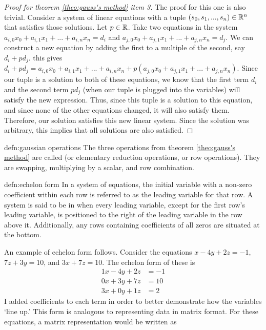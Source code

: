 \begin{proof}[Proof for theorem \ref{theo:gauss's method} item 3]
	The proof for this one is also trivial. Consider a system of linear equations with a tuple $(s_0, s_1,..., s_n) \in{\mathbb R}^n$ that satisfies those solutions. Let $p \in {\mathbb R}$. Take two equations in the system $a_{i,0}x_0 + a_{i,1}x_1 + ... + a_{i,n}x_n = d_i$ and $a_{j,0}x_0 + a_{j,1}x_1 + ... + a_{j,n}x_n = d_j$. We can construct a new equation by adding the first to a multiple of the second, say $d_i + pd_j$. this gives $d_i + pd_j = a_{i,0}x_0 + a_{i,1}x_1 + ... + a_{i,n}x_n + p(a_{j,0}x_0 + a_{j,1}x_1 + ... + a_{j,n}x_n)$. Since our tuple is a solution to both of these equations, we know that the first term $d_i$ and the second term $pd_j$ (when our tuple is plugged into the variables) will satisfy the new expression. Thus, since this tuple is a solution to this equation, and since none of the other equations changed, it will also satisfy them. Therefore, our solution satisfies this new linear system. Since the solution was arbitrary, this implies that all solutions are also satisfied.
\end{proof}

\begin{defn}{defn:gaussian operations}
	The three operations from theorem \ref{theo:gauss's method} are called  (or elementary reduction operations, or row operations). They are swapping, multiplying by a scalar, and row combination.
\end{defn}


\begin{defn}{defn:echelon form}
	In a system of equations, the initial variable with a non-zero coefficient within each row is referred to as the leading variable for that row. A system is said to be in  when every leading variable, except for the first row's leading variable, is positioned to the right of the leading variable in the row above it. Additionally, any rows containing coefficients of all zeros are situated at the bottom.
\end{defn}


An example of echelon form follows. Consider the equations $x - 4y + 2z = -1$, $7z + 3y = 10$, and $3x + 7z = 10$. The echelon form of these is 
\begin{align}
1x - 4y + 2z &= -1 \\
0x+3y + 7z &= 10 \\
3x+0y+1z &= 2
\end{align}
I added coefficients to each term in order to better demonstrate how the variables `line up.' This form is analogous to representing data in matrix format. For these equations, a matrix representation would be written as

